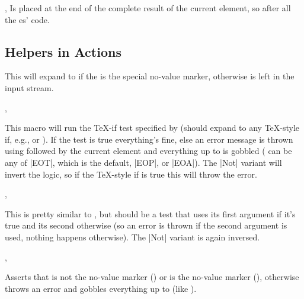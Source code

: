 \begin{function}{\ekvpEOA,\ekvpGobbleA}
  Is placed at the end of the complete result of the current element, so after
  all the \prefix{}es'  code.
\end{function}


\subsection{Helpers in Actions}

\begin{function}{\ekvpIfNoVal}
  \begin{syntax}
  \end{syntax}
  This will expand to  if the  is the special no-value
  marker, otherwise  is left in the input stream.
\end{function}

\begin{function}{\ekvpAssertIf,\ekvpAssertIfNot}
  \begin{syntax}
  \end{syntax}
  This macro will run the \TeX-if test specified by  (should expand to
  any \TeX-style if, e.g.,  or
  ). If the test is true everything's fine,
  else an error message is thrown using  followed by the current
  element and everything up to  is gobbled ( can be
  any of |EOT|, which is the default, |EOP|, or |EOA|). The |Not| variant will
  invert the logic, so if the \TeX-style if is true this will throw the error.
\end{function}

\begin{function}{\ekvpAssertTF,\ekvpAssertTFNot}
  \begin{syntax}
  \end{syntax}
  This is pretty similar to , but  should be a test
  that uses its first argument if it's true and its second otherwise (so an
  error is thrown if the second argument is used, nothing happens otherwise).
  The |Not| variant is again inversed.
\end{function}

\begin{function}{\ekvpAssertValue,\ekvpAssertNoValue}
  \begin{syntax}
  \end{syntax}
  Asserts that  is not the no-value marker () or
  is the no-value marker (), otherwise throws an error and
  gobbles everything up to  (like ).
\end{function}

